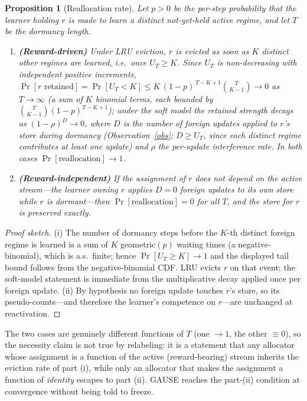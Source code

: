 \documentclass[10pt]{article}
\newtheorem{proposition}{Proposition}
\begin{document}
\begin{proposition}[Reallocation rate]
\label{prop:realloc}
Let $p>0$ be the per-step probability that the learner holding $r$ is made to learn
a distinct not-yet-held active regime, and let $T$ be the dormancy length.
\begin{enumerate}[label=(\roman*), itemsep=1pt, topsep=2pt]
\item \textbf{(Reward-driven)} Under LRU eviction, $r$ is evicted as soon as $K$
distinct other regimes are learned, i.e.\ once $U_T\ge K$. Since $U_T$ is
non-decreasing with independent positive increments, $\Pr[r\text{ retained}]
=\Pr[U_T<K]\le K\,(1-p)^{\,T-K+1}\binom{T}{K-1}\to 0$ as $T\to\infty$ (a sum of $K$
binomial terms, each bounded by $\binom{T}{K-1}(1-p)^{T-K+1}$); under the
soft model the retained strength decays as $(1-\rho)^{D}\to 0$, where $D$ is the
number of foreign updates applied to $r$'s store during dormancy
(Observation~\ref{obs}; $D\ge U_T$, since each distinct regime contributes at least
one update) and $\rho$ the per-update interference rate. In both cases $\Pr[\text{reallocation}]\to 1$.
\item \textbf{(Reward-independent)} If the assignment of $r$ does not depend on the
active stream---the learner owning $r$ applies $D=0$ foreign updates to its own
store while $r$ is dormant---then $\Pr[\text{reallocation}]=0$ for all $T$, and the
store for $r$ is preserved exactly.
\end{enumerate}
\end{proposition}

\begin{proof}[Proof sketch]
(i) The number of dormancy steps before the $K$-th distinct foreign regime is
learned is a sum of $K$ geometric$(p)$ waiting times (a negative-binomial), which
is a.s.\ finite; hence $\Pr[U_T\ge K]\to 1$ and the displayed tail bound follows
from the negative-binomial CDF. LRU evicts $r$ on that event; the soft-model
statement is immediate from the multiplicative decay applied once per foreign
update. (ii) By hypothesis no foreign update touches $r$'s store, so its
pseudo-counts---and therefore the learner's competence on $r$---are unchanged at
reactivation. \end{proof}

The two cases are genuinely different functions of $T$ (one $\to1$, the other
$\equiv 0$), so the necessity claim is not true by relabeling: it is a statement
that any allocator whose assignment is a function of the active (reward-bearing)
stream inherits the eviction rate of part (i), while only an allocator that makes
the assignment a function of \emph{identity} escapes to part (ii). GAUSE reaches
the part-(ii) condition at convergence without being told to freeze.
\end{document}
